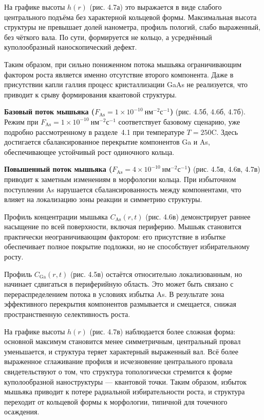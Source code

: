 \documentclass[14pt,oneside]{extarticle}
\begin{document}
На графике высоты $h(r)$ (рис. 4.7а) это выражается в виде слабого центрального подъёма без характерной кольцевой формы. Максимальная высота структуры не превышает долей нанометра, профиль пологий, слабо выраженный, без чёткого вала. По сути, формируется не кольцо, а усреднённый куполообразный наноскопический дефект.

Таким образом, при сильно пониженном потока мышьяка ограничивающим фактором роста является именно отсутствие второго компонента. Даже в присутствии капли галлия процесс кристаллизации GaAs не реализуется, что приводит к срыву формирования квантовой структуры.

\textbf{Базовый поток мышьяка ($F_\mathrm{As} = 1 \times 10^{-10}~\text{нм}^{-2}\text{с}^{-1}$)} (рис. 4.5б, 4.6б, 4.7б). Режим при $F_\mathrm{As} = 1 \times 10^{-10}~\text{нм}^{-2}\text{с}^{-1}$ соответствует базовому сценарию, уже подробно рассмотренному в разделе~4.1 при температуре $T = 250$\textdegree C. Здесь достигается сбалансированное перекрытие компонентов Ga и As, обеспечивающее устойчивый рост одиночного кольца.
 
\textbf{Повышенный поток мышьяка ($F_\mathrm{As} = 4 \times 10^{-10}~\text{нм}^{-2}\text{с}^{-1}$)} (рис. 4.5в, 4.6в, 4.7в) приводит к заметным изменениям в морфологии кольца. При избыточном поступлении As нарушается сбалансированность между компонентами, что влияет на локализацию зоны реакции и симметрию структуры.

Профиль концентрации мышьяка $C_\mathrm{As}(r, t)$ (рис. 4.6в) демонстрирует раннее насыщение по всей поверхности, включая периферию. Мышьяк становится практически неограничивающим фактором: его присутствие в избытке обеспечивает полное покрытие подложки, но не способствует избирательному росту.

Профиль $C_\mathrm{Ga}(r, t)$ (рис. 4.5в) остаётся относительно локализованным, но начинает сдвигаться в периферийную область. Это может быть связано с перераспределением потока в условиях избытка As. В результате зона эффективного перекрытия компонентов размывается и смещается, снижая пространственную селективность роста.

На графике высоты $h(r)$ (рис. 4.7в) наблюдается более сложная форма: основной максимум становится менее симметричным, центральный провал уменьшается, и структура теряет характерный выраженный вал. Всё более выраженное сглаживание профиля и исчезновение центрального провала свидетельствуют о том, что структура топологически стремится к форме куполообразной наноструктуры — квантовой точки. Таким образом, избыток мышьяка приводит к потере радиальной избирательности роста, и структура переходит от кольцевой формы к морфологии, типичной для точечного осаждения.
\end{document}
